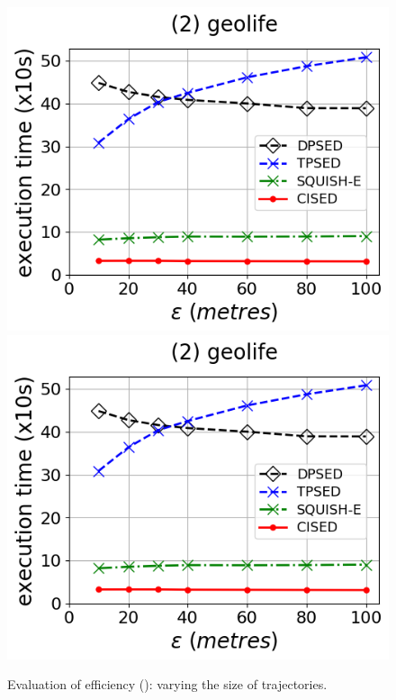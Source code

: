 \begin{figure}[tb!]
	\includegraphics[scale=0.315]{Figures/Exp-time-epsilon-geolife.png}	\hspace{1ex}
	\includegraphics[scale=0.315]{Figures/Exp-time-epsilon-geolife.png}	\hspace{1ex}
	\vspace{-2.5ex}
	\caption{\small Evaluation of efficiency (\sed): varying the size of trajectories.}\label{fig:time-size-sed}
	\vspace{-1ex}
\end{figure}
	
